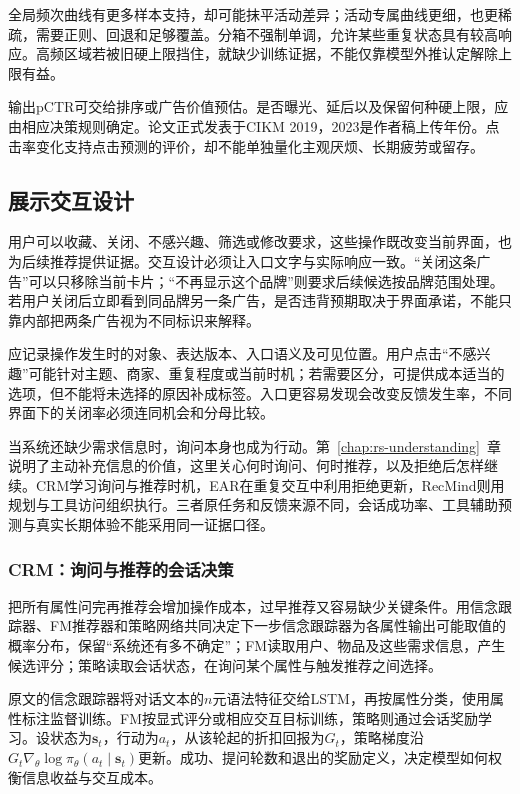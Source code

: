 全局频次曲线有更多样本支持，却可能抹平活动差异；活动专属曲线更细，也更稀疏，需要正则、回退和足够覆盖。分箱不强制单调，允许某些重复状态具有较高响应。高频区域若被旧硬上限挡住，就缺少训练证据，不能仅靠模型外推认定解除上限有益。

输出pCTR可交给排序或广告价值预估。是否曝光、延后以及保留何种硬上限，应由相应决策规则确定。论文正式发表于CIKM 2019，2023是作者稿上传年份。点击率变化支持点击预测的评价，却不能单独量化主观厌烦、长期疲劳或留存。

\subsection{展示交互设计}
\label{sec:rs-presentation-interaction}

用户可以收藏、关闭、不感兴趣、筛选或修改要求，这些操作既改变当前界面，也为后续推荐提供证据。交互设计必须让入口文字与实际响应一致。“关闭这条广告”可以只移除当前卡片；“不再显示这个品牌”则要求后续候选按品牌范围处理。若用户关闭后立即看到同品牌另一条广告，是否违背预期取决于界面承诺，不能只靠内部把两条广告视为不同标识来解释。

应记录操作发生时的对象、表达版本、入口语义及可见位置。用户点击“不感兴趣”可能针对主题、商家、重复程度或当前时机；若需要区分，可提供成本适当的选项，但不能将未选择的原因补成标签。入口更容易发现会改变反馈发生率，不同界面下的关闭率必须连同机会和分母比较。

当系统还缺少需求信息时，询问本身也成为行动。第~\ref{chap:rs-understanding}~章说明了主动补充信息的价值，这里关心何时询问、何时推荐，以及拒绝后怎样继续。CRM学习询问与推荐时机，EAR在重复交互中利用拒绝更新，RecMind则用规划与工具访问组织执行。三者原任务和反馈来源不同，会话成功率、工具辅助预测与真实长期体验不能采用同一证据口径。

\subsubsection{CRM：询问与推荐的会话决策}
\label{sec:rs-crm}

把所有属性问完再推荐会增加操作成本，过早推荐又容易缺少关键条件。用信念跟踪器、FM推荐器和策略网络共同决定下一步信念跟踪器为各属性输出可能取值的概率分布，保留“系统还有多不确定”；FM读取用户、物品及这些需求信息，产生候选评分；策略读取会话状态，在询问某个属性与触发推荐之间选择。

原文的信念跟踪器将对话文本的$n$元语法特征交给LSTM，再按属性分类，使用属性标注监督训练。FM按显式评分或相应交互目标训练，策略则通过会话奖励学习。设状态为$\bm s_t$，行动为$a_t$，从该轮起的折扣回报为$G_t$，策略梯度沿$G_t\nabla_\theta\log\pi_\theta(a_t\mid\bm s_t)$更新。成功、提问轮数和退出的奖励定义，决定模型如何权衡信息收益与交互成本。

